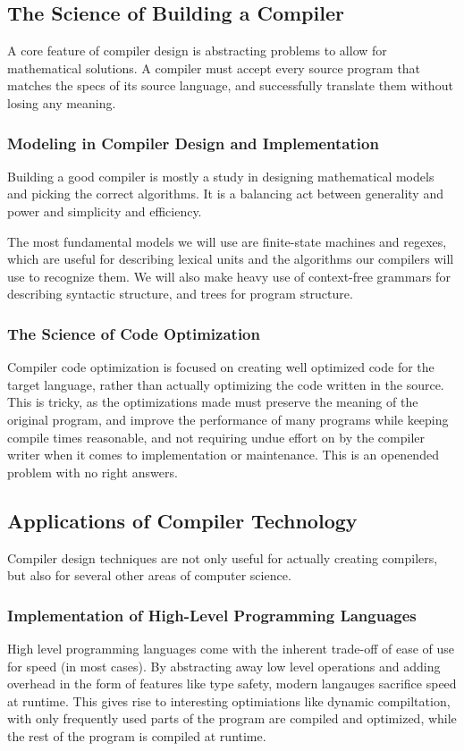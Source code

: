\documentclass[titlepage]{article}
\begin{document}
\subsection{The Science of Building a Compiler}
A core feature of compiler design is abstracting problems to allow for mathematical solutions. A compiler must accept every source program that matches the specs of its source language, and successfully translate them without losing any meaning.

\subsubsection*{Modeling in Compiler Design and Implementation}
Building a good compiler is mostly a study in designing mathematical models and picking the correct algorithms. It is a balancing act between generality and power and simplicity and efficiency.

The most fundamental models we will use are finite-state machines and regexes, which are useful for describing lexical units and the algorithms our compilers will use to recognize them. We will also make heavy use of context-free grammars for describing syntactic structure, and trees for program structure.

\subsubsection*{The Science of Code Optimization}
Compiler code optimization is focused on creating well optimized code for the target language, rather than actually optimizing the code written in the source. This is tricky, as the optimizations made must preserve the meaning of the original program, and improve the performance of many programs while keeping compile times reasonable, and not requiring undue effort on by the compiler writer when it comes to implementation or maintenance. This is an openended problem with no right answers.

\subsection{Applications of Compiler Technology}
Compiler design techniques are not only useful for actually creating compilers, but also for several other areas of computer science.

\subsubsection*{Implementation of High-Level Programming Languages}
High level programming languages come with the inherent trade-off of ease of use for speed (in most cases). By abstracting away low level operations and adding overhead in the form of features like type safety, modern langauges sacrifice speed at runtime. This gives rise to interesting optimiations like dynamic compiltation, with only frequently used parts of the program are compiled and optimized, while the rest of the program is compiled at runtime.
\end{document}
